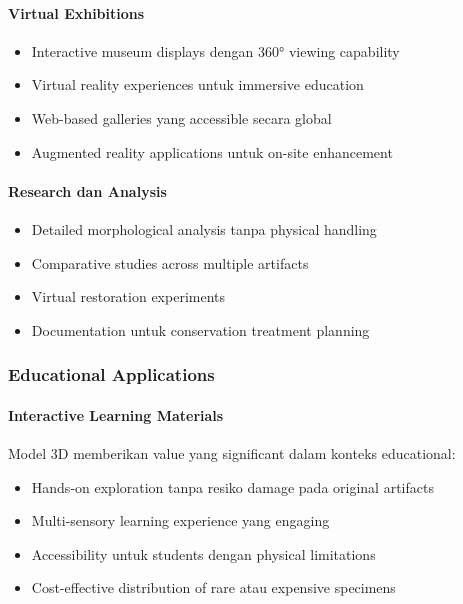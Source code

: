 \documentclass[12pt,a4paper]{article}
\begin{document}
\paragraph{Virtual Exhibitions}
\begin{itemize}
    \item Interactive museum displays dengan 360° viewing capability
    \item Virtual reality experiences untuk immersive education
    \item Web-based galleries yang accessible secara global
    \item Augmented reality applications untuk on-site enhancement
\end{itemize}

\paragraph{Research dan Analysis}
\begin{itemize}
    \item Detailed morphological analysis tanpa physical handling
    \item Comparative studies across multiple artifacts
    \item Virtual restoration experiments
    \item Documentation untuk conservation treatment planning
\end{itemize}

\subsubsection{Educational Applications}

\paragraph{Interactive Learning Materials}
Model 3D memberikan value yang significant dalam konteks educational:

\begin{itemize}
    \item Hands-on exploration tanpa resiko damage pada original artifacts
    \item Multi-sensory learning experience yang engaging
    \item Accessibility untuk students dengan physical limitations
    \item Cost-effective distribution of rare atau expensive specimens
\end{itemize}
\end{document}

